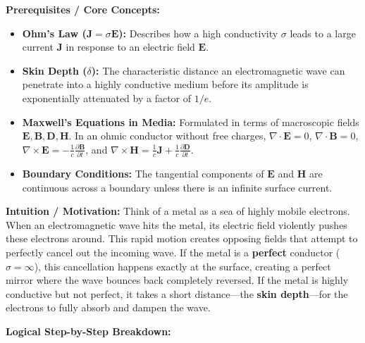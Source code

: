 \begin{solution}
\textbf{Prerequisites / Core Concepts:}
\begin{itemize}
    \item \textbf{Ohm's Law ($\mathbf{J} = \sigma \mathbf{E}$):} Describes how a high conductivity $\sigma$ leads to a large current $\mathbf{J}$ in response to an electric field $\mathbf{E}$.
    \item \textbf{Skin Depth ($\delta$):} The characteristic distance an electromagnetic wave can penetrate into a highly conductive medium before its amplitude is exponentially attenuated by a factor of $1/e$.
    \item \textbf{Maxwell's Equations in Media:} Formulated in terms of macroscopic fields $\mathbf{E}, \mathbf{B}, \mathbf{D}, \mathbf{H}$. In an ohmic conductor without free charges, $\nabla \cdot \mathbf{E} = 0$, $\nabla \cdot \mathbf{B} = 0$, $\nabla \times \mathbf{E} = -\frac{1}{c} \frac{\partial \mathbf{B}}{\partial t}$, and $\nabla \times \mathbf{H} = \frac{1}{c} \mathbf{J} + \frac{1}{c} \frac{\partial \mathbf{D}}{\partial t}$.
    \item \textbf{Boundary Conditions:} The tangential components of $\mathbf{E}$ and $\mathbf{H}$ are continuous across a boundary unless there is an infinite surface current.
\end{itemize}

\textbf{Intuition / Motivation:}
Think of a metal as a sea of highly mobile electrons. When an electromagnetic wave hits the metal, its electric field violently pushes these electrons around. This rapid motion creates opposing fields that attempt to perfectly cancel out the incoming wave. If the metal is a \textbf{perfect} conductor ($\sigma = \infty$), this cancellation happens exactly at the surface, creating a perfect mirror where the wave bounces back completely reversed. If the metal is highly conductive but not perfect, it takes a short distance—the \textbf{skin depth}—for the electrons to fully absorb and dampen the wave.

\textbf{Logical Step-by-Step Breakdown:}


\end{solution}
